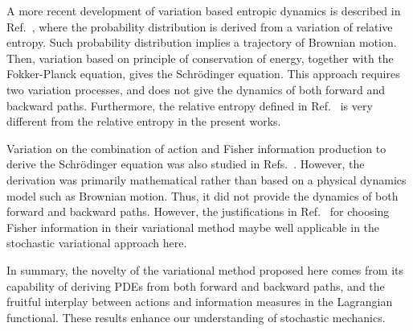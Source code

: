 \documentclass[%
 aip, 
 amsmath,amssymb,amsthm,
 nofootinbib,
 reprint,
]{revtex4-1}
\begin{document}
A more recent development of variation based entropic dynamics is described in Ref.~\cite{Caticha}, where the probability distribution is derived from a variation of relative entropy. Such probability distribution implies a trajectory of Brownian motion. Then, variation based on principle of conservation of energy, together with the Fokker-Planck equation, gives the Schr\"{o}dinger equation. This approach requires two variation processes, and does not give the dynamics of both forward and backward paths. Furthermore, the relative entropy defined in Ref.~\cite{Caticha} is very different from the relative entropy in the present works. 

Variation on the combination of action and Fisher information production to derive the Schr\"{o}dinger equation was also studied in Refs.~\cite{Reginatto, Parwani}. However, the derivation was primarily mathematical rather than based on a physical dynamics model such as Brownian motion. Thus, it did not provide the dynamics of both forward and backward paths. However, the justifications in Ref.~\cite{Parwani} for choosing Fisher information in their variational method maybe well applicable in the stochastic variational approach here.

In summary, the novelty of the variational method proposed here comes from its capability of deriving PDEs from both forward and backward paths, and the fruitful interplay between actions and information measures in the Lagrangian functional. These results enhance our understanding of stochastic mechanics.
\end{document}
